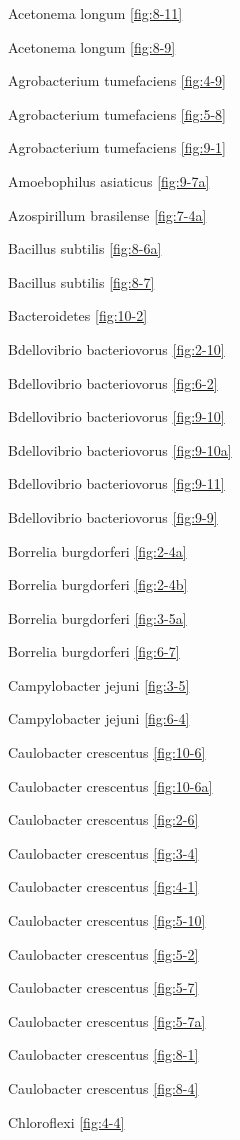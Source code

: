 \documentclass[]{tufte-book}
\begin{document}
Acetonema longum \ref{fig:8-11}

Acetonema longum \ref{fig:8-9}

Agrobacterium tumefaciens \ref{fig:4-9}

Agrobacterium tumefaciens \ref{fig:5-8}

Agrobacterium tumefaciens \ref{fig:9-1}

Amoebophilus asiaticus \ref{fig:9-7a}

Azospirillum brasilense \ref{fig:7-4a}

Bacillus subtilis \ref{fig:8-6a}

Bacillus subtilis \ref{fig:8-7}

Bacteroidetes \ref{fig:10-2}

Bdellovibrio bacteriovorus \ref{fig:2-10}

Bdellovibrio bacteriovorus \ref{fig:6-2}

Bdellovibrio bacteriovorus \ref{fig:9-10}

Bdellovibrio bacteriovorus \ref{fig:9-10a}

Bdellovibrio bacteriovorus \ref{fig:9-11}

Bdellovibrio bacteriovorus \ref{fig:9-9}

Borrelia burgdorferi \ref{fig:2-4a}

Borrelia burgdorferi \ref{fig:2-4b}

Borrelia burgdorferi \ref{fig:3-5a}

Borrelia burgdorferi \ref{fig:6-7}

Campylobacter jejuni \ref{fig:3-5}

Campylobacter jejuni \ref{fig:6-4}

Caulobacter crescentus \ref{fig:10-6}

Caulobacter crescentus \ref{fig:10-6a}

Caulobacter crescentus \ref{fig:2-6}

Caulobacter crescentus \ref{fig:3-4}

Caulobacter crescentus \ref{fig:4-1}

Caulobacter crescentus \ref{fig:5-10}

Caulobacter crescentus \ref{fig:5-2}

Caulobacter crescentus \ref{fig:5-7}

Caulobacter crescentus \ref{fig:5-7a}

Caulobacter crescentus \ref{fig:8-1}

Caulobacter crescentus \ref{fig:8-4}

Chloroflexi \ref{fig:4-4}
\end{document}
